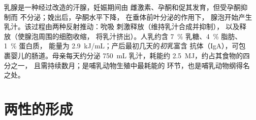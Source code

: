 \begin{proposition}[泌乳]\label{prop:b2:mammal-reproduction:lactation}
乳腺是一种经过改造的汗腺，妊娠期间由
雌激素、孕酮和促其发育，但受孕酮抑制而
不分泌；娩出后，孕酮水平下降，
在垂体前叶分泌的\emph{}作用下，
腺泡开始产生乳汁。该过程由两种反射推动：吮吸
刺激释放（维持乳汁合成并抑制），
以及释放（使腺泡周围的细胞收缩，
将乳汁挤出）。人乳约含
\qty{7}{\%} 乳糖、\qty{4}{\%} 脂肪、\qty{1}{\%} 蛋白质，
能量为 \qty{2.9}{kJ/mL}；产后最初几天的\emph{初乳}富含
抗体（IgA），可包裹婴儿的肠道。母亲每天约分泌
\qty{750}{mL} 乳汁，耗能约 \qty{2.5}{MJ}，约占其食物的四分之一，
且需持续数月；是哺乳动物生殖中最耗能的
环节，也是哺乳动物纲得名之处。
\end{proposition}

\section{两性的形成}

